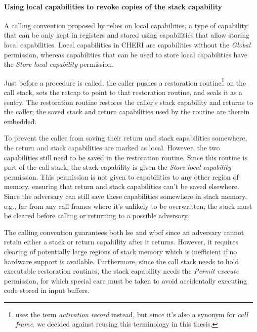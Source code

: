 \documentclass[main.tex]{subfiles}
\begin{document}
\paragraph{Using local capabilities to revoke copies of the stack capability} A calling convention proposed by \cite{retptr} relies on local capabilities, a type of capability that can be only kept in registers and stored using capabilities that allow storing local capabilities. Local capabilities in CHERI are capabilities without the \emph{Global} permission, whereas capabilities that can be used to store local capabilities have the \emph{Store local capability} permission.

Just before a procedure is called, the caller pushes a restoration routine\footnote{\cite{retptr} uses the term \emph{activation record} instead, but since it's also a synonym for \emph{call frame}, we decided against reusing this terminology in this thesis.} on the call stack, sets the \gls{retcap} to point to that restoration routine, and seals it as a \gls{sentry}. The restoration routine restores the caller's stack capability and returns to the caller; the saved stack and return capabilities used by the routine are therein embedded.

To prevent the callee from saving their return and stack capabilities somewhere, the return and stack capabilities are marked as local. However, the two capabilities still need to be saved in the restoration routine. Since this routine is part of the call stack, the stack capability is given the \emph{Store local capability} permission. This permission is not given to capabilities to any other region of memory, ensuring that return and stack capabilities can't be saved elsewhere. Since the adversary can still save these capabilities somewhere in stack memory, e.g., far from any call frames where it's unlikely to be overwritten, the stack must be cleared before calling or returning to a possible adversary.

The calling convention guarantees both \gls{lse} and \gls{wbcf} since an adversary cannot retain either a stack or return capability after it returns. However, it requires clearing of potentially large regions of stack memory which is inefficient if no hardware support is available. Furthermore, since the call stack needs to hold executable restoration routines, the stack capability needs the \emph{Permit execute} permission, for which special care must be taken to avoid accidentally executing code stored in input buffers.
\end{document}
